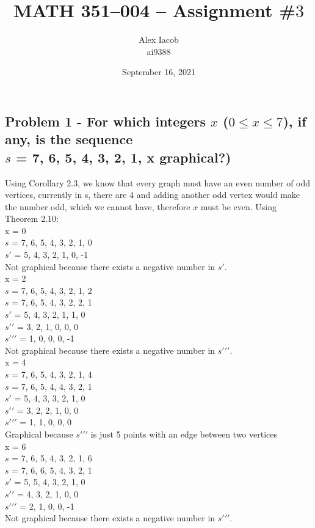 \documentclass[10pt,a4paper]{article}
\title{MATH 351--004 -- Assignment \#$3$\\
}
\author{Alex Iacob\\
ai9388}
\date{September 16, 2021}
\begin{document}
\maketitle

\subsection*{Problem 1 - For which integers $x$ ($0 \leq x \leq 7$), if any, is the sequence \\ $s$ = 7, 6, 5, 4, 3, 2, 1, x graphical?)}
Using Corollary 2.3, we know that every graph must have an even number of odd vertices, currently in s, there are 4 and adding another odd vertex would make the number odd, which we cannot have, therefore $x$ must be even.
\newline
Using Theorem 2.10:\\
\newline
x = 0\\
$s$ = 7, 6, 5, 4, 3, 2, 1, $0$\\
$s\prime$ = 5, 4, 3, 2, 1, 0, -1\\
Not graphical because there exists a negative number in $s\prime$. \\
\newline
x = 2\\
$s$ = 7, 6, 5, 4, 3, 2, 1, $2$\\
$s$ = 7, 6, 5, 4, 3, 2, 2, 1\\
$s\prime$ = 5, 4, 3, 2, 1, 1, 0\\
$s\prime\prime$ = 3, 2, 1, 0, 0, 0\\
$s\prime\prime\prime$ = 1, 0, 0, 0, -1\\
Not graphical because there exists a negative number in $s\prime\prime\prime$. \\
\newline
x = 4\\
$s$ = 7, 6, 5, 4, 3, 2, 1, $4$\\
$s$ = 7, 6, 5, 4, 4, 3, 2, 1\\
$s\prime$ = 5, 4, 3, 3, 2, 1, 0\\
$s\prime\prime$ = 3, 2, 2, 1, 0, 0\\
$s\prime\prime\prime$ = 1, 1, 0, 0, 0\\
Graphical because $s\prime\prime\prime$ is just 5 points with an edge between two vertices\\
\newline
x = 6\\
$s$ = 7, 6, 5, 4, 3, 2, 1, $6$\\
$s$ = 7, 6, 6, 5, 4, 3, 2, 1\\
$s\prime$ = 5, 5, 4, 3, 2, 1, 0\\
$s\prime\prime$ = 4, 3, 2, 1, 0, 0\\
$s\prime\prime\prime$ = 2, 1, 0, 0, -1\\
Not graphical because there exists a negative number in $s\prime\prime\prime$. \\
\end{document}
